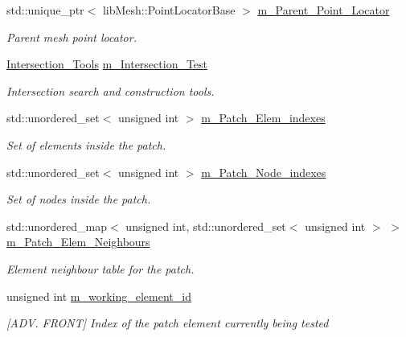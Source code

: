 \begin{DoxyCompactItemize}
std\+::unique\+\_\+ptr$<$ lib\+Mesh\+::\+Point\+Locator\+Base $>$ \hyperlink{classcarl_1_1_patch__construction_a382e1ea46006b1ea6445af758e157ceb}{m\+\_\+\+Parent\+\_\+\+Point\+\_\+\+Locator}
\begin{DoxyCompactList}\small\item\em Parent mesh point locator. \end{DoxyCompactList}\item 
\hyperlink{classcarl_1_1_intersection___tools}{Intersection\+\_\+\+Tools} \hyperlink{classcarl_1_1_patch__construction_a59f947d3d18761b1ad1a5913eb59ca83}{m\+\_\+\+Intersection\+\_\+\+Test}
\begin{DoxyCompactList}\small\item\em Intersection search and construction tools. \end{DoxyCompactList}\item 
std\+::unordered\+\_\+set$<$ unsigned int $>$ \hyperlink{classcarl_1_1_patch__construction_af7db498027d46bff8464757e824404fb}{m\+\_\+\+Patch\+\_\+\+Elem\+\_\+indexes}
\begin{DoxyCompactList}\small\item\em Set of elements inside the patch. \end{DoxyCompactList}\item 
std\+::unordered\+\_\+set$<$ unsigned int $>$ \hyperlink{classcarl_1_1_patch__construction_a85fb959e6f57d935a8d6fe0d4f0f7f46}{m\+\_\+\+Patch\+\_\+\+Node\+\_\+indexes}
\begin{DoxyCompactList}\small\item\em Set of nodes inside the patch. \end{DoxyCompactList}\item 
std\+::unordered\+\_\+map$<$ unsigned int, std\+::unordered\+\_\+set$<$ unsigned int $>$ $>$ \hyperlink{classcarl_1_1_patch__construction_a47c4343835537781c48813feed01e60e}{m\+\_\+\+Patch\+\_\+\+Elem\+\_\+\+Neighbours}
\begin{DoxyCompactList}\small\item\em Element neighbour table for the patch. \end{DoxyCompactList}\item 
unsigned int \hyperlink{classcarl_1_1_patch__construction_a7889a62e6717124c405bc508b03f3254}{m\+\_\+working\+\_\+element\+\_\+id}
\begin{DoxyCompactList}\small\item\em \mbox{[}A\+D\+V. F\+R\+O\+N\+T\mbox{]} Index of the patch element currently being tested \end{DoxyCompactList}\item 

\end{DoxyCompactItemize}
